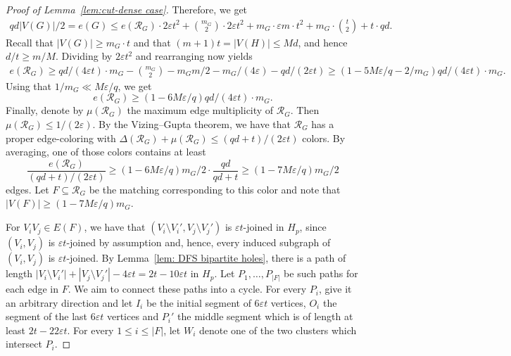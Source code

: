 \documentclass[10pt,a4paper]{amsart}
\begin{document}
\begin{proof}[Proof of Lemma~\ref{lem:cut-dense case}]
Therefore, we get
\begin{align*}
    qd|V(G)|/2=e(G)\leq e(\mathcal{R}_G)\cdot 2\varepsilon t^2+\binom{m_G}{2}\cdot 2\varepsilon t^2+m_G\cdot\varepsilon m\cdot t^2+m_G\cdot \binom{t}{2}+t\cdot qd.
\end{align*}
Recall that $|V(G)|\geq m_G\cdot t$ and that $(m+1)t=|V(H)| \leq Md$, and hence $d/t\geq m/M$. Dividing by $2\varepsilon t^2$ and rearranging now yields
\begin{align*}
    e(\mathcal R_G) \geq qd/(4\varepsilon t)\cdot m_G- \binom{m_G}{2}-m_Gm/2-m_G/(4\varepsilon)-qd/(2\varepsilon t)\geq (1-5M\varepsilon/q-2/m_G)qd/(4\varepsilon t)\cdot m_G. 
\end{align*}
Using that $1/m_G\ll M\varepsilon/q$, we get 
$$
e(\mathcal R_G) \geq (1-6M\varepsilon/q)qd/(4\varepsilon t)\cdot m_G. 
$$
Finally, denote by $\mu(\mathcal R_G)$ the maximum edge multiplicity of $\mathcal R_G$. Then $\mu(\mathcal R_G)\leq 1/(2\varepsilon)$. By the Vizing--Gupta theorem, we have that $\mathcal R_G$ has a proper edge-coloring with $\Delta(\mathcal R_G)+\mu(\mathcal R_G)\leq (qd+t)/(2\varepsilon t)$ colors. By averaging, one of those colors contains at least
$$
\frac{e(\mathcal R_G)}{(qd+t)/(2\varepsilon t)}\geq (1-6 M \varepsilon /q)m_G/2\cdot\frac{qd}{qd+t}\geq (1-7M\varepsilon/q)m_G/2
$$
edges. Let $F\subseteq \mathcal R_G$ be the matching corresponding to this color and note that $|V(F)|\geq (1-7M\varepsilon/q) m_G$.

For $V_iV_j\in E(F)$, we have that $(V_i\setminus V_i',V_j\setminus V_j')$ is $\varepsilon t$-joined in $H_p$, since $(V_i,V_j)$ is $\varepsilon t$-joined by assumption and, hence, every induced subgraph of $(V_i,V_j)$ is $\varepsilon t$-joined. By Lemma~\ref{lem: DFS bipartite holes}, there is a path of length $|V_i\setminus V_i'|+|V_j\setminus V_j'|-4\varepsilon t = 2t-10\varepsilon t$ in $H_p$.  Let $P_1,\ldots,P_{|F|}$ be such paths for each edge in $F$. We aim to connect these paths into a cycle. For every $P_i$, give it an arbitrary direction and let $I_i$ be the initial segment of $6\varepsilon t$ vertices, $O_i$ the segment of the last $6\varepsilon t$ vertices and $P_i'$ the middle segment which is of length at least $2t-22\varepsilon t$. For every $1\leq i\leq |F|$, let $W_i$ denote one of the two clusters which intersect $P_i$.


\end{proof}
\end{document}
